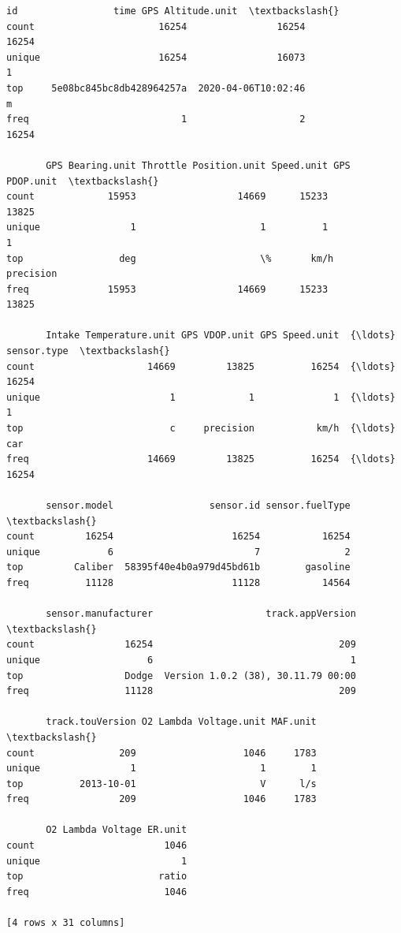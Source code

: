 \documentclass[11pt]{article}
\begin{document}
    \begin{Verbatim}[commandchars=\\\{\}]
                              id                 time GPS Altitude.unit  \textbackslash{}
count                      16254                16254             16254
unique                     16254                16073                 1
top     5e08bc845bc8db428964257a  2020-04-06T10:02:46                 m
freq                           1                    2             16254

       GPS Bearing.unit Throttle Position.unit Speed.unit GPS PDOP.unit  \textbackslash{}
count             15953                  14669      15233         13825
unique                1                      1          1             1
top                 deg                      \%       km/h     precision
freq              15953                  14669      15233         13825

       Intake Temperature.unit GPS VDOP.unit GPS Speed.unit  {\ldots} sensor.type  \textbackslash{}
count                    14669         13825          16254  {\ldots}       16254
unique                       1             1              1  {\ldots}           1
top                          c     precision           km/h  {\ldots}         car
freq                     14669         13825          16254  {\ldots}       16254

       sensor.model                 sensor.id sensor.fuelType  \textbackslash{}
count         16254                     16254           16254
unique            6                         7               2
top         Caliber  58395f40e4b0a979d45bd61b        gasoline
freq          11128                     11128           14564

       sensor.manufacturer                    track.appVersion  \textbackslash{}
count                16254                                 209
unique                   6                                   1
top                  Dodge  Version 1.0.2 (38), 30.11.79 00:00
freq                 11128                                 209

       track.touVersion O2 Lambda Voltage.unit MAF.unit  \textbackslash{}
count               209                   1046     1783
unique                1                      1        1
top          2013-10-01                      V      l/s
freq                209                   1046     1783

       O2 Lambda Voltage ER.unit
count                       1046
unique                         1
top                        ratio
freq                        1046

[4 rows x 31 columns]
    \end{Verbatim}
\end{document}
